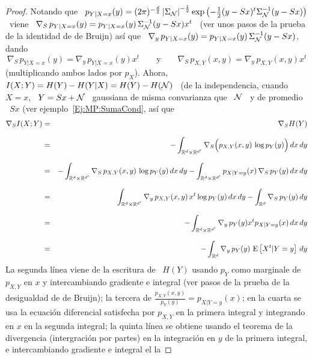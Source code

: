 %
\begin{proof}
  Notando  que \ $p_{Y|X=x}  (y) =  (2 \pi)^{-\frac{d}{2}}  \left| \Sigma_{\mathcal{N}}
  \right|^{-\frac12}  \exp\left( -\frac12  (y-S  x)^t \Sigma_{\mathcal{N}}^{-1}  (y-Sx)
  \right)$   \   viene  \   $\nabla_S   \,   p_{Y|X=x}(y)   =  p_{Y|X=x}(y)   \,
  \Sigma_{\mathcal{N}}^{-1}  (y -  S x)  x^t$ \  (ver  unos pasos  de la  prueba de  la
  identidad de de  Bruijn) as\'i que \ $\nabla_y  \, p_{Y|X=x}(y) = p_{Y|X=x}(y)
  \, \Sigma_{\mathcal{N}}^{-1} (y - S x)$, dando
  \[
  \nabla_S \, p_{Y|X=x}(y) = \nabla_y \, p_{Y|X=x}(y) x^t \qquad \mbox{y} \qquad
  \nabla_S \, p_{X,Y}(x,y) = \nabla_y \, p_{X,Y}(x,y) x^t
  \]
  (multiplicando ambos lados por $p_X$). Ahora, \ $I(X;Y) = H(Y) - H(Y|X) = H(Y)
  - H(\mathcal{N})$ \ (de la independencia, cuando \ $X  = x$, \ $Y = S x + \mathcal{N}$ \
  gaussiana de  misma convarianza que \  $\mathcal{N}$ \ y  de promedio \ $S  x$ (ver
  ejemplo~\ref{Ej:MP:SumaCond},
  as\'i que
  \begin{eqnarray*}
  \nabla_S I(X;Y) & = & \nabla_S H(Y)\\[2.5mm]
  & = & - \int_{\mathbb{R}^d \times \mathbb{R}^{d'}} \nabla_S \Big( p_{X,Y}(x,y) \, \log
  p_Y(y) \Big) \, dx \, dy\\[2.5mm]
  & = & - \int_{\mathbb{R}^d \times \mathbb{R}^{d'}} \nabla_S \, p_{X,Y}(x,y) \, \log p_Y(y) \,
  dx \, dy - \int_{\mathbb{R}^d \times \mathbb{R}^{d'}} p_{X|Y=y}(x) \, \nabla_S \, p_Y(y) \, dx \,
  dy\\[2.5mm]
  & = & \int_{\mathbb{R}^d \times \mathbb{R}^{d'}} \nabla_y \, p_{X,Y}(x,y) \, x^t \log p_Y(y)
  \, dx \, dy - \int_{\mathbb{R}^d} \nabla_S \, p_Y(y) \, dy\\[2.5mm]
  & = & - \int_{\mathbb{R}^d \times \mathbb{R}^{d'}} \nabla_y \, p_Y(y) x^t p_{X|Y=y}(x) \, dx
  \, dy\\[2.5mm]
  & = & - \int_{\mathbb{R}^d} \nabla_y \, p_Y(y) \, \operatorname{E}\left[X^t | Y = y \right] \, dy
  \end{eqnarray*}
  La  segunda l\'inea  viene  de la  escritura  de \  $H(Y)$  usando $p_Y$  como
  marginale de $p_{X,Y}$ en $x$ y intercambiando gradiente e integral (ver pasos
  de   la   prueba  de   la   desigualdad  de   de   Bruijn);   la  tercera   de
  $\frac{p_{X,Y}(x,y)}{p_Y(y)}  =   p_{X|Y=y}(x)$;  en  la  cuarta   se  usa  la
  ecuaci\'on  diferencial satisfecha  por  $p_{X,Y}$ en  la  primera integral  y
  integrando en $x$ en la segunda  integral; la quinta l\'inea se obtiene usando
  el teorema de  la divergencia (intergraci\'on por partes)  en la integraci\'on
  en $y$  de la primera  integral, e intercambiando  gradiente e integral  el la

\end{proof}
